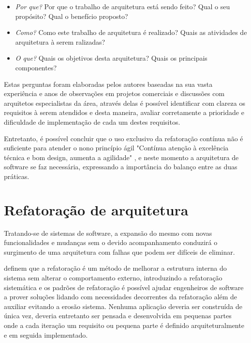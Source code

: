 \begin{itemize}
    \item \textit{Por que?} Por que o trabalho de arquitetura está sendo feito? Qual o seu propósito? Qual o benefício proposto?
    \item \textit{Como?} Como este trabalho de arquitetura é realizado? Quais as atividades de arquitetura à serem ralizadas?
    \item \textit{O que?} Quais os objetivos desta arquitetura? Quais os principais componentes?
\end{itemize}

Estas perguntas foram elaboradas pelos autores baseadas na sua vasta experiência e anos de observações em projetos comerciais e discussões com arquitetos especialistas da área, através delas é possível identificar com clareza os requisitos à serem atendidos e desta maneira, avaliar corretamente a prioridade e dificuldade de implementação de cada um destes requisitos.

Entretanto, é possível concluir que o uso exclusivo da refatoração contínua não é suficiente para atender o nono princípio ágil "Contínua atenção à excelência técnica e bom design, aumenta a agilidade" \cite{beck2001manifesto}, e neste momento a arquitetura de software se faz necessária, expressando a importância do balanço entre as duas práticas.


\section{Refatoração de arquitetura}

Tratando-se de sistemas de software, a expansão do mesmo com novas funcionalidades e mudanças sem o devido acompanhamento conduzirá o surgimento de uma arquitetura com falhas que podem ser difíceis de eliminar. 

\cite{babar2013agile} definem que a refatoração é um método de melhorar a estrutura interna do sistema sem alterar o comportamento externo, introduzindo a refatoração sistemática e os padrões de refatoração é possível ajudar engenheiros de software a prover soluções lidando com necessidades decorrentes da refatoração além de auxiliar evitando a erosão sistema.
Nenhuma aplicação deveria ser construída de única vez,  deveria entretanto ser pensada e desenvolvida em pequenas partes onde a cada iteração um requisito ou pequena parte é definido arquiteturalmente e em seguida implementado.

